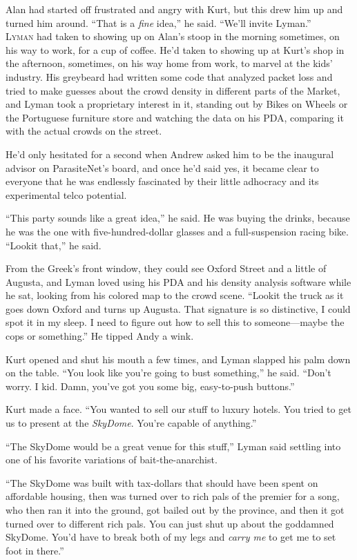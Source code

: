 Alan had started off frustrated and angry with Kurt, but this drew him
up and turned him around.  ``That is a \textit{fine} idea,'' he said. 
``We'll invite Lyman.''
\\
\lettrine[lines=3, lhang=.5, nindent=0pt, findent=2pt]{L}{yman} had taken to showing up on Alan's stoop in the morning
sometimes, on his way to work, for a cup of coffee.  He'd taken to
showing up at Kurt's shop in the afternoon, sometimes, on his way home
from work, to marvel at the kids' industry.  His greybeard had written
some code that analyzed packet loss and tried to make guesses about
the crowd density in different parts of the Market, and Lyman took a
proprietary interest in it, standing out by Bikes on Wheels or the
Portuguese furniture store and watching the data on his PDA, comparing
it with the actual crowds on the street.

He'd only hesitated for a second when Andrew asked him to be the
inaugural advisor on ParasiteNet's board, and once he'd said yes, it
became clear to everyone that he was endlessly fascinated by their
little adhocracy and its experimental telco potential.

``This party sounds like a great idea,'' he said.  He was buying the
drinks, because he was the one with five-hundred-dollar glasses and a
full-suspension racing bike.  ``Lookit that,'' he said.

From the Greek's front window, they could see Oxford Street and a
little of Augusta, and Lyman loved using his PDA and his density
analysis software while he sat, looking from his colored map to the
crowd scene.  ``Lookit the truck as it goes down Oxford and turns up
Augusta.  That signature is so distinctive, I could spot it in my
sleep.  I need to figure out how to sell this to someone---maybe the
cops or something.'' He tipped Andy a wink.

Kurt opened and shut his mouth a few times, and Lyman slapped his palm
down on the table.  ``You look like you're going to bust something,''
he said.  ``Don't worry.  I kid.  Damn, you've got you some big,
easy-to-push buttons.''

Kurt made a face.  ``You wanted to sell our stuff to luxury hotels. 
You tried to get us to present at the \textit{SkyDome}.  You're
capable of anything.''

``The SkyDome would be a great venue for this stuff,'' Lyman said
settling into one of his favorite variations of bait-the-anarchist.

``The SkyDome was built with tax-dollars that should have been spent
on affordable housing, then was turned over to rich pals of the
premier for a song, who then ran it into the ground, got bailed out by
the province, and then it got turned over to different rich pals.  You
can just shut up about the goddamned SkyDome.  You'd have to break
both of my legs and \textit{carry me} to get me to set foot in
there.''

